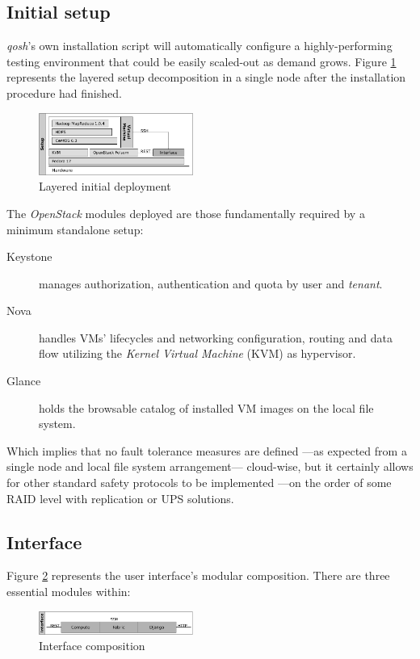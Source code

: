 \documentclass{sig-alternate}
\begin{document}
\subsection{Initial setup}

\noindent \emph{qosh}'s own installation script will automatically configure a highly-performing testing environment that could be easily scaled-out as demand grows. Figure \ref{fig:initial} represents the layered setup decomposition in a single node after the installation procedure had finished.

\begin{figure}[htp]
\centering
\includegraphics[width=0.45\textwidth]{img/005}
\caption{Layered initial deployment}
\label{fig:initial}
\end{figure}

The \emph{OpenStack} modules deployed are those fundamentally required by a minimum standalone setup:

\begin{description}
 \item[Keystone] manages authorization, authentication and quota by user and \emph{tenant}.
 \item[Nova] handles VMs' lifecycles and networking configuration, routing and data flow utilizing the \emph{Kernel Virtual Machine} (KVM) as hypervisor.
 \item[Glance] holds the browsable catalog of installed VM images on the local file system.
\end{description}

Which implies that no fault tolerance measures are defined ---as expected from a single node and local file system arrangement--- cloud-wise, but it certainly allows for other standard safety protocols to be implemented ---on the order of some RAID level with replication or UPS solutions.


\subsection{Interface}
\noindent Figure \ref{fig:interface} represents the user interface's modular composition. There are three essential modules within:

\begin{figure}[tp]
\centering
\includegraphics[width=0.45\textwidth]{img/003}
\caption{Interface composition}
\label{fig:interface}
\end{figure}
\end{document}
